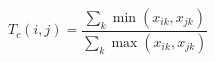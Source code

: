 \documentclass[border=1pt]{standalone}
\begin{document}
\color[HTML]{1F3342}
$T_c(i,j) =
\dfrac{\sum_k \min(x_{ik},x_{jk})}{\sum_k \max(x_{ik},x_{jk})}$
\end{document}
